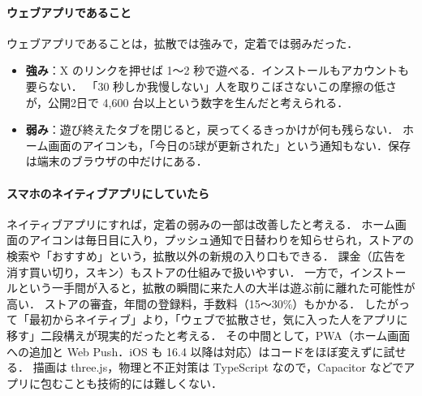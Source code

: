 \documentclass[a4paper,10pt]{ltjsarticle}
\begin{document}
\paragraph{ウェブアプリであること} ウェブアプリであることは，拡散では強みで，定着では弱みだった．
\begin{itemize}
  \item \textbf{強み}：X のリンクを押せば 1〜2 秒で遊べる．インストールもアカウントも要らない．
  「30 秒しか我慢しない」人を取りこぼさないこの摩擦の低さが，公開2日で 4,600 台以上という数字を生んだと考えられる．
  \item \textbf{弱み}：遊び終えたタブを閉じると，戻ってくるきっかけが何も残らない．
  ホーム画面のアイコンも，「今日の5球が更新された」という通知もない．保存は端末のブラウザの中だけにある．
\end{itemize}

\paragraph{スマホのネイティブアプリにしていたら} ネイティブアプリにすれば，定着の弱みの一部は改善したと考える．
ホーム画面のアイコンは毎日目に入り，プッシュ通知で日替わりを知らせられ，ストアの検索や「おすすめ」という，拡散以外の新規の入り口もできる．
課金（広告を消す買い切り，スキン）もストアの仕組みで扱いやすい．
一方で，インストールという一手間が入ると，拡散の瞬間に来た人の大半は遊ぶ前に離れた可能性が高い．
ストアの審査，年間の登録料，手数料（15〜30\%）もかかる．
したがって「最初からネイティブ」より，「ウェブで拡散させ，気に入った人をアプリに移す」二段構えが現実的だったと考える．
その中間として，PWA（ホーム画面への追加と Web Push．iOS も 16.4 以降は対応）はコードをほぼ変えずに試せる．
描画は three.js，物理と不正対策は TypeScript なので，Capacitor などでアプリに包むことも技術的には難しくない．
\end{document}
